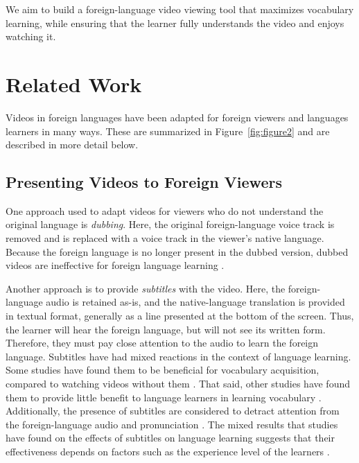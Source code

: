 \documentclass{sigchi}
\begin{document}
We aim to build a foreign-language video viewing tool
that maximizes vocabulary learning, while ensuring that the learner
fully understands the video and enjoys watching it.


\section{Related Work}

Videos in foreign languages have been adapted for foreign viewers and languages learners in many ways. These are summarized in Figure~\ref{fig:figure2} and are described in more detail below.

\subsection{Presenting Videos to Foreign Viewers}

One approach used to adapt videos for viewers who do not understand the original language is \emph{dubbing}. Here, the original foreign-language voice track is removed and is replaced with a voice track in the viewer's native language.
Because the foreign language is no longer present in the dubbed version, dubbed videos are ineffective for foreign language learning \cite{dubbing}.

Another approach is to provide \emph{subtitles} with the video. Here, the foreign-language audio is retained as-is, and the native-language translation is provided in textual format, generally as a line presented at the bottom of the screen.
Thus, the learner will hear the foreign language, but will not see its written form. Therefore, they must pay close attention to the audio
to learn the foreign language.
Subtitles have had mixed reactions in the context of language learning. Some studies have found them to be beneficial for vocabulary acquisition, compared to watching videos without them \cite{danan2004captioning}.
That said, other studies have found them to provide little benefit to language learners in learning vocabulary \cite{danan1992reversed}. Additionally, the presence of subtitles are considered to detract attention from the foreign-language audio and pronunciation \cite{mitterer2009foreign}.
The mixed results that studies have found on the effects of subtitles on language learning suggests that their effectiveness depends on factors such as the experience level of the learners \cite{bianchi2008captions}.
\end{document}

